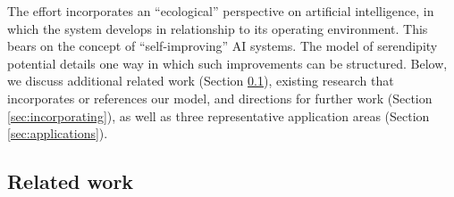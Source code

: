 
The effort incorporates an ``ecological'' \cite{kenyon2013ecological}
perspective on artificial intelligence, in which the system develops
in relationship to its operating environment.  This bears on the
concept of ``self-improving'' \cite{Majot2017} AI systems.  The model
of serendipity potential details one way in which such improvements
can be structured.
Below, we discuss additional related work (Section \ref{sec:related}),
existing research that incorporates or references our model, and 
directions for further work (Section
\ref{sec:incorporating}), as well as three representative application
areas (Section \ref{sec:applications}).
 
\subsection{Related work} \label{sec:related}


